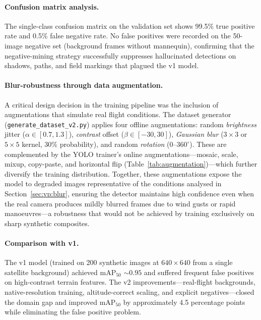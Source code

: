 \paragraph{Confusion matrix analysis.}
The single-class confusion matrix on the validation set shows 99.5\% true positive rate and 0.5\% false negative rate.  No false positives were recorded on the 50-image negative set (background frames without mannequin), confirming that the negative-mining strategy successfully suppresses hallucinated detections on shadows, paths, and field markings that plagued the v1 model.

\paragraph{Blur-robustness through data augmentation.}
A critical design decision in the training pipeline was the inclusion of augmentations that simulate real flight conditions.  The dataset generator (\texttt{generate\_dataset\_v2.py}) applies four offline augmentations: random \emph{brightness} jitter ($\alpha \in [0.7, 1.3]$), \emph{contrast} offset ($\beta \in [-30, 30]$), \emph{Gaussian blur} ($3\!\times\!3$ or $5\!\times\!5$ kernel, 30\% probability), and random \emph{rotation} ($0$--$360^{\circ}$).  These are complemented by the YOLO trainer's online augmentations---mosaic, scale, mixup, copy-paste, and horizontal flip (Table~\ref{tab:augmentation})---which further diversify the training distribution.  Together, these augmentations expose the model to degraded images representative of the conditions analysed in Section~\ref{sec:vp:blur}, ensuring the detector maintains high confidence even when the real camera produces mildly blurred frames due to wind gusts or rapid manoeuvres---a robustness that would not be achieved by training exclusively on sharp synthetic composites.

\paragraph{Comparison with v1.}
The v1 model (trained on 200 synthetic images at $640 \times 640$ from a single satellite background) achieved mAP$_{50}$ ${\sim}0.95$ and suffered frequent false positives on high-contrast terrain features.  The v2 improvements---real-flight backgrounds, native-resolution training, altitude-correct scaling, and explicit negatives---closed the domain gap and improved mAP$_{50}$ by approximately 4.5 percentage points while eliminating the false positive problem.

